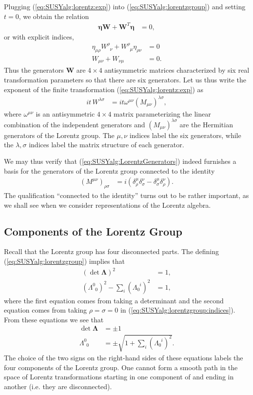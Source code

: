 Plugging (\ref{eq:SUSYalg:lorentz:exp}) into  (\ref{eq:SUSYalg:lorentzgroup}) and setting $t=0$, we obtain the relation
\begin{align}
    \mathbf{\eta} \mathbf{W} + \mathbf{W}^T \mathbf{\eta} &= 0,
\end{align}
or with explicit indices,
\begin{align}
    \eta_{\mu\rho}W^\rho_{\phantom\rho\nu} + W^\rho_{\phantom\rho\mu}\eta_{\rho\nu} &=0\\
    W_{\mu\nu} + W_{\nu\mu} &= 0.
\end{align}
Thus the generators $\mathbf{W}$ are $4\times 4$ antisymmetric matrices characterized by six real transformation parameters so that there are six generators. Let us thus write the exponent of the finite transformation (\ref{eq:SUSYalg:lorentz:exp}) as
\begin{align}
    it\,W^{\lambda\sigma} &= i t\omega^{\mu\nu}\left(M_{\mu\nu}\right)^{\lambda\sigma},
\end{align}
where $\omega^{\mu\nu}$ is an antisymmetric $4 \times 4$ matrix parameterizing the linear combination of the independent generators and $\left(M_{\mu\nu}\right)^{\lambda\sigma}$ are the Hermitian generators of the Lorentz group. The $\mu,\nu$ indices label the six generators, while the $\lambda,\sigma$ indices label the matrix structure of each generator.

We may thus verify that  (\ref{eq:SUSYalg:LorentzGenerators}) indeed furnishes a basis for the generators of the Lorentz group connected to the identity
\begin{align}
(M^{\mu\nu})_{\rho\sigma}&=i(\delta^\mu_\rho\delta^\nu_\sigma-\delta^\mu_\sigma\delta^\nu_\rho).
\end{align}
The qualification ``connected to the identity'' turns out to be rather important, as we shall see when we consider representations of the Lorentz algebra.

\subsection{Components of the Lorentz Group}

Recall that the Lorentz group has four disconnected parts. The defining  (\ref{eq:SUSYalg:lorentzgroup}) implies that 
\begin{align}
    \left(\det \mathbf\Lambda\right)^2 &= 1,\\
    (\Lambda^0_{\phantom{0}0})^2-\sum_i(\Lambda_0^{\phantom{0}i})^2 &=1,
\end{align}
where the first equation comes from taking a determinant and the second equation comes from taking $\rho=\sigma=0$ in  (\ref{eq:SUSYalg:lorentzgroup:indices}). From these equations we see that 
\begin{align}
    \det\mathbf\Lambda &= \pm 1\\
    \Lambda^0_{\phantom 00} &= \pm \sqrt{1+\sum_i(\Lambda_0^{\phantom{0}i})^2}.
\end{align}
The choice of the two signs on the right-hand sides of these equations labels the four components of the Lorentz group. One cannot form a smooth path in the space of Lorentz transformations starting in one component of and ending in another (i.e. they are disconnected).

